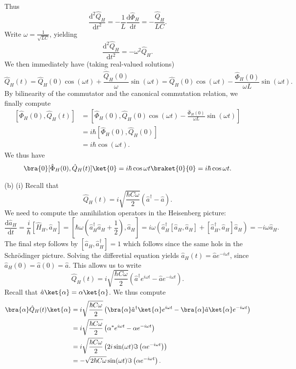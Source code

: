 \documentclass[11pt, letterpaper]{article}
\begin{document}
Thus
\[
	\frac{\mathrm{d}^2\hat{Q} _H}{\mathrm{d}t^2} =-\frac{1}{L} \frac{\mathrm{d}\hat{\Phi }_H}{\mathrm{d}t} =-\frac{\hat{Q} _H}{LC} 
.\]
Write $\omega =\frac{1}{\sqrt{LC} } $, yielding
\[
	\frac{\mathrm{d}^2 \hat{Q} _H}{\mathrm{d}t^2} =-\omega ^2 \hat{Q} _H
.\]
We then immediately have (taking real-valued solutions)
\[
	\hat{Q} _H(t)=\hat{Q} _H(0) \cos (\omega t) + \frac{\dot{\hat{Q} }_H(0)}{\omega } \sin (\omega t)=\hat{Q}_H(0)\cos (\omega t)-\frac{\hat{\Phi }_H(0)}{\omega L} \sin (\omega t)
.\]
By bilinearity of the commutator and the canonical commutation relation, we finally compute
\begin{align*}
	\left[ \hat{\Phi }_H(0), \hat{Q} _H(t) \right] &=\left[ \hat{\Phi }_H(0),\hat{Q}_H(0)\cos (\omega t)-\frac{\hat{\Phi }_H(0)}{\omega L} \sin (\omega t) \right] \\
						       &=i\hbar \left[ \hat{\Phi }_H(0),\hat{Q} _H(0) \right] \\
						       &=i\hbar \cos (\omega t)
.\end{align*}
We thus have
\[
	\bra{0}[\hat{\Phi }_H(0),\hat{Q} _H(t)]\ket{0}=i\hbar \cos \omega t\braket{0}{0}=i\hbar \cos \omega t
.\]

(b) (i) Recall that
\[
	\hat{Q}_H(t) =i\sqrt{\frac{\hbar C\omega }{2} } \left( \hat{a} ^\dagger - \hat{a}  \right) 
.\]
We need to compute the annihilation operators in the Heisenberg picture:
\[
	\frac{\mathrm{d}\hat{a} _H}{\mathrm{d}t} =\frac{i}{\hbar } \left[ \hat{H} _H, \hat{a} _H \right] =\left[ \hbar \omega \left( \hat{a} ^\dagger_H \hat{a} _H+\frac{1}{2}  \right) , \hat{a} _H \right] =i\omega \left( \hat{a} _H^\dagger \left[ \hat{a} _H,\hat{a} _H \right] +\left[ \hat{a} _H^\dagger, \hat{a} _H \right] \hat{a} _H \right) =-i\omega \hat{a} _H
.\]
The final step follows by $[\hat{a} _H,\hat{a}^\dagger_H]=1$ which follows since the same hols in the Schr\"odinger picture. Solving the differetial equation yields $\hat{a} _H(t)=\hat{a} e^{-i\omega t} $, since $\hat{a} _H(0)=\hat{a} (0)=\hat{a} $. This allows us to write
\[
	\hat{Q} _H(t)=i\sqrt{\frac{\hbar C\omega }{2} } \left( \hat{a} ^\dagger e^{i\omega t} - \hat{a} e^{-i\omega t}  \right) 
.\]
Recall that $\hat{a} \ket{\alpha }=\alpha \ket{\alpha }$. We thus compute
\begin{align*}
	\bra{\alpha }\hat{Q} _H(t)\ket{\alpha }&=i\sqrt{\frac{\hbar C\omega }{2} } \left( \bra{\alpha }\hat{a} ^\dagger \ket{\alpha }e^{i\omega t} -\bra{\alpha }\hat{a} \ket{\alpha }e^{-i\omega t}  \right) \\
					       &=i\sqrt{\frac{\hbar C\omega }{2} } \left( \alpha ^* e^{i\omega t} -\alpha e^{-i\omega t}  \right) \\
					       &=i\sqrt{\frac{\hbar C\omega }{2} } \left( 2i \sin (\omega t)\Im \left( \alpha e^{-i\omega t}  \right)  \right) \\
					       &=-\sqrt{2\hbar C\omega } \sin (\omega t)\Im \left( \alpha e^{-i\omega t}  \right) 
.\end{align*}
\end{document}
